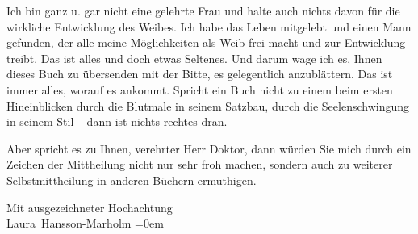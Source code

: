 \pstart
           Ich bin ganz u. gar nicht eine gelehrte Frau und halte auch nichts davon für die
               wirkliche Entwicklung des Weibes. Ich habe das Leben mitgelebt und einen Mann gefunden, der alle meine
               Möglichkeiten als Weib frei macht und zur Entwicklung treibt. Das ist alles und doch
               etwas Seltenes. Und darum wage ich es, Ihnen dieses Buch zu übersenden mit der Bitte, es gelegentlich
               anzublättern. Das ist immer alles, worauf es ankommt. Spricht ein Buch nicht zu einem
               beim ersten Hineinblicken durch die Blutmale in seinem Satzbau, durch die
               Seelenschwingung in seinem Stil – dann ist nichts rechtes dran.\pend
           
\pstart
           Aber spricht es zu Ihnen, verehrter Herr Doktor, dann würden Sie mich durch ein
               Zeichen der Mittheilung nicht nur sehr froh machen, sondern auch zu weiterer
               Selbstmittheilung in anderen Büchern ermuthigen.\pend
           
\pstart
           Mit ausgezeichneter Hochachtung{\\[\baselineskip]}\spacefill\mbox{Laura Hansson-Marholm}\pend
           \leftskip=0em{}\endnumbering{}  \newcommand{\dateiname}{L00429}\newcommand{\titel}{Laura Marholm an Arthur Schnitzler, 16. 4. 1895}\newcommand{\editorInnen}{Martin Anton Müller und Gerd-Hermann Susen}
